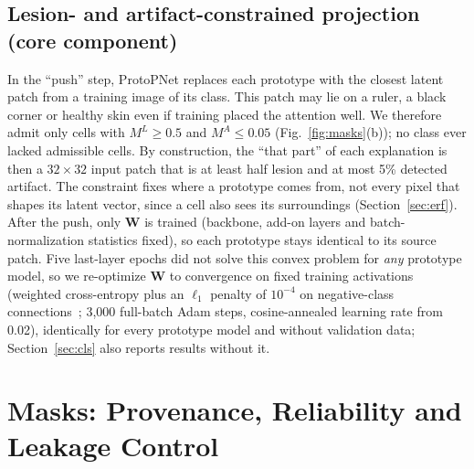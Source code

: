 \documentclass[conference]{IEEEtran}
\begin{document}
\subsection{Lesion- and artifact-constrained projection (core component)}
\label{sec:push}
In the ``push'' step, ProtoPNet replaces each prototype with the closest latent patch from a training image of its class. This patch may lie on a ruler, a black corner or healthy skin even if training placed the attention well. We therefore admit only cells with $M^L\geq0.5$ and $M^A\leq0.05$ (Fig.~\ref{fig:masks}(b)); no class ever lacked admissible cells. By construction, the ``that part'' of each explanation is then a $32\times32$ input patch that is at least half lesion and at most 5\% detected artifact. The constraint fixes where a prototype comes from, not every pixel that shapes its latent vector, since a cell also sees its surroundings (Section~\ref{sec:erf}). After the push, only $\mathbf{W}$ is trained (backbone, add-on layers and batch-normalization statistics fixed), so each prototype stays identical to its source patch. Five last-layer epochs did not solve this convex problem for \emph{any} prototype model, so we re-optimize $\mathbf{W}$ to convergence on fixed training activations (weighted cross-entropy plus an $\ell_1$ penalty of $10^{-4}$ on negative-class connections~\cite{chen2019}; 3{,}000 full-batch Adam steps, cosine-annealed learning rate from 0.02), identically for every prototype model and without validation data; Section~\ref{sec:cls} also reports results without it.

\section{Masks: Provenance, Reliability and Leakage Control}
\label{sec:masks}
\end{document}
